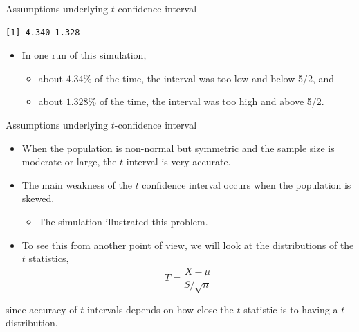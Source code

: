 \documentclass[
  ignorenonframetext,
]{beamer}
\providecommand{\tightlist}{%
  \setlength{\itemsep}{0pt}\setlength{\parskip}{0pt}}
\begin{document}
\begin{frame}[fragile]{Assumptions underlying \(t\)-confidence interval}
\begin{verbatim}
[1] 4.340 1.328
\end{verbatim}

\normalsize

\begin{itemize}
\item
  In one run of this simulation,

  \begin{itemize}
  \tightlist
  \item
    about \(4.34\%\) of the time, the interval was too low and below
    5/2, and
  \item
    about \(1.328\%\) of the time, the interval was too high and above
    5/2.
  \end{itemize}
\end{itemize}
\end{frame}

\begin{frame}{Assumptions underlying \(t\)-confidence interval}
\label{assumptions-underlying-t-confidence-interval-4}
\begin{itemize}
\item
  When the population is non-normal but symmetric and the sample size is
  moderate or large, the \(t\) interval is very accurate.
\item
  The main weakness of the \(t\) confidence interval occurs when the
  population is skewed.

  \begin{itemize}
  \tightlist
  \item
    The simulation illustrated this problem.
  \end{itemize}
\item
  To see this from another point of view, we will look at the
  distributions of the \(t\) statistics,
  \[T=\frac{\bar{X}-\mu}{S/\sqrt{n}}\]
\end{itemize}

since accuracy of \(t\) intervals depends on how close the \(t\)
statistic is to having a \(t\) distribution.
\end{frame}
\end{document}

